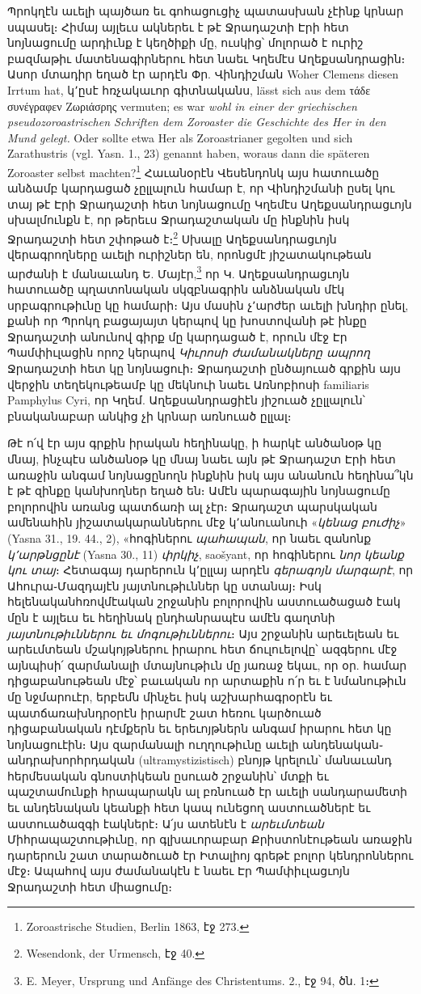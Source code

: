\documentclass{article}
\begin{document}
{Պրոկղէն աւելի պայծառ եւ գոհացուցիչ պատասխան չէինք կրնար սպասել։ Հիմայ այլեւս ակներեւ է թէ Ջրադաշտի Էրի հետ նոյնացումը արդիւնք է կեղծիքի մը, ուսկից՝ մոլորած է ուրիշ բազմաթիւ մատենագիրներու հետ նաեւ Կղեմէս Աղեքսանդրացին։ Ասոր մտադիր եղած էր արդէն Փր. Վինդիշման Woher Clemens diesen Irrtum hat, կ՚ըսէ հռչակաւոր գիտնականս, lässt sich aus dem τάδε συνέγραφεν Ζωριάσρης vermuten; es war \emph{wohl in einer der griechischen pseudozoroastrischen Schriften dem Zoroaster die Geschichte des Her in den Mund gelegt.} Oder sollte etwa Her als Zoroastrianer gegolten und sich Zarathustris (vgl. Yasn. 1., 23) genannt haben, woraus dann die späteren Zoroaster selbst machten?\footnote{Zoroastrische Studien, Berlin 1863, էջ 273.} Հաւանօրէն Վեսենդոնկ այս հատուածը անձամբ կարդացած չըլլալուն համար է, որ Վինդիշմանի ըսել կու տայ թէ Էրի Ջրադաշտի հետ նոյնացումը Կղեմէս Աղեքսանդրացւոյն սխալմունքն է, որ թերեւս Ջրադաշտական մը ինքնին իսկ Ջրադաշտի հետ շփոթած է։\footnote{Wesendonk, der Urmensch, էջ 40.} Սխալը Աղեքսանդրացւոյն վերագրողները աւելի ուրիշներ են, որոնցմէ յիշատակութեան արժանի է մանաւանդ Ե. Մայէր,\footnote{E. Meyer, Ursprung und Anfänge des Christentums. 2., էջ 94, ծն. 1։} որ Կ. Աղեքսանդրացւոյն հատուածը պղատոնական սկզբնագրին անձնական մէկ սրբագրութիւնը կը համարի։ Այս մասին չ՚արժեր աւելի խնդիր ընել, քանի որ Պրոկղ բացայայտ կերպով կը խոստովանի թէ ինքը Ջրադաշտի անունով գիրք մը կարդացած է, որուն մէջ Էր Պամփիւլացին որոշ կերպով \emph{Կիւրոսի ժամանակները ապրող} Ջրադաշտի հետ կը նոյնացուի։ Ջրադաշտի ընծայուած գրքին այս վերջին տեղեկութեամբ կը մեկնուի նաեւ Առնոբիոսի familiaris Pamphylus Cyri, որ Կղեմ. Աղեքսանդրացիէն յիշուած չըլլալուն՝ բնականաբար անկից չի կրնար առնուած ըլլալ։

Թէ ո՛վ էր այս գրքին իրական հեղինակը, ի հարկէ անծանօթ կը մնայ, ինչպէս անծանօթ կը մնայ նաեւ այն թէ Ջրադաշտ Էրի հետ առաջին անգամ նոյնացընողն ինքնին իսկ այս անանուն հեղինա՞կն է թէ զինքը կանխողներ եղած են։ Ամէն պարագային նոյնացումը բոլորովին առանց պատճառի ալ չէր։ Ջրադաշտ պարսկական ամենահին յիշատակարաններու մէջ կ՚անուանուի «\emph{կենաց բուժիչ}» (Yasna 31., 19. 44., 2), «հոգիներու \emph{պահապան}, որ նաեւ զանոնք \emph{կ՚արթնցընէ} (Yasna 30., 11) \emph{փրկիչ}, saošyant, որ հոգիներու \emph{նոր կեանք կու տայ}։ Հետագայ դարերուն կ՚ըլլայ արդէն \emph{գերագոյն մարգարէ}, որ Ահուրա֊Մազդայէն յայտնութիւններ կը ստանայ։ Իսկ հելենականհռովմէական շրջանին բոլորովին աստուածացած էակ մըն է այլեւս եւ հեղինակ ընդհանրապէս ամէն գաղտնի \emph{յայտնութիւններու եւ մոգութիւններու}։ Այս շրջանին արեւելեան եւ արեւմտեան մշակոյթներու իրարու հետ ճուլուելովը՝ ազգերու մէջ այնպիսի՛ զարմանալի մտայնութիւն մը յառաջ եկաւ, որ օր. համար դիցաբանութեան մէջ՝ բաւական որ արտաքին ո՛ր եւ է նմանութիւն մը նջմարուէր, երբեմն մինչեւ իսկ աշխարհագրօրէն եւ պատճառախնդրօրէն իրարմէ շատ հեռու կարծուած դիցաբանական դէմքերն եւ երեւոյթներն անգամ իրարու հետ կը նոյնացուէին։ Այս զարմանալի ուղղութիւնը աւելի անդենական֊անդրախորհրդական (ultramystizistisch) բնոյթ կրելուն՝ մանաւանդ հերմեսական գնոստիկեան ըսուած շրջանին՝ մտքի եւ պաշտամունքի հրապարակն ալ բռնուած էր աւելի սանդարամետի եւ անդենական կեանքի հետ կապ ունեցող աստուածներէ եւ աստուածազգի էակներէ։ Ա՛յս ատենէն է \emph{արեւմտեան} Միհրապաշտութիւնը, որ գլխաւորաբար Քրիստոնէութեան առաջին դարերուն շատ տարածուած էր Իտալիոյ գրեթէ բոլոր կենդրոններու մէջ։ Ապահով այս ժամանակէն է նաեւ Էր Պամփիւլացւոյն Ջրադաշտի հետ միացումը։

}
\end{document}

